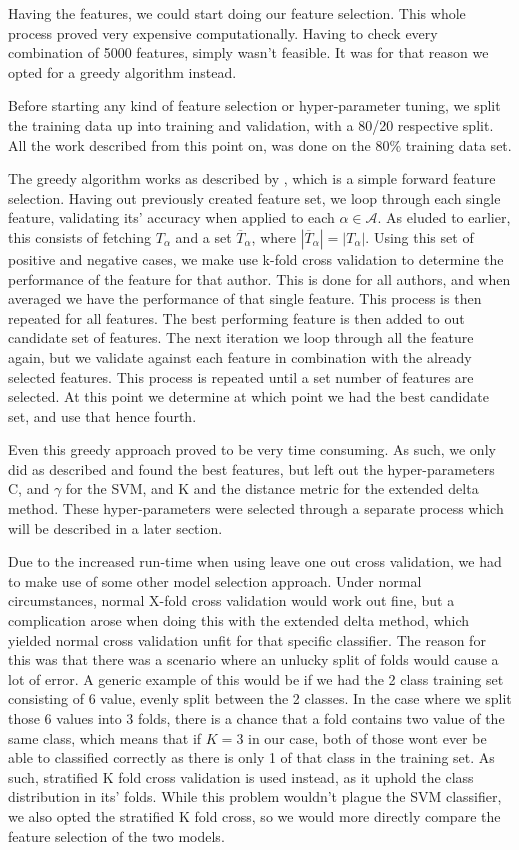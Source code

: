 Having the features, we could start doing our feature selection. This whole
process proved very expensive computationally. Having to check every combination
of 5000 features, simply wasn't feasible. It was for that reason we opted for a
greedy algorithm instead.

Before starting any kind of feature selection or hyper-parameter tuning,
we split the training data up into training and validation, with a
80/20 respective split. All the work described from this point on,
was done on the 80\% training data set.

The greedy algorithm works as described by \cite{kanDeng}, which is a simple
forward feature selection. Having out previously created feature set, we loop
through each single feature, validating its' accuracy when applied to each
$\alpha \in \mathcal{A}$. As eluded to earlier, this consists of fetching
$T_{\alpha}$ and a set $\overline{T}_{\alpha}$, where $|\overline{T}_\alpha| =
|T_\alpha|$. Using this set of positive and negative cases, we make use k-fold
cross validation to determine the performance of the feature for that author.
This is done for all authors, and when averaged we have the performance of
that single feature. This process is then repeated for all features. The best
performing feature is then added to out candidate set of features. The next
iteration we loop through all the feature again, but we validate against each
feature in combination with the already selected features. This process is
repeated until a set number of features are selected. At this point we determine
at which point we had the best candidate set, and use that hence fourth.

Even this greedy approach proved to be very time consuming. As such, we only did
as described and found the best features, but left out the hyper-parameters C,
and $\gamma$ for the SVM, and K and the distance metric for the extended delta
method. These hyper-parameters were selected through a separate process
which will be described in a later section.

Due to the increased run-time when using leave one out cross validation,
we had to make use of some other model selection approach. Under normal
circumstances, normal X-fold cross validation would work out fine, but a complication
arose when doing this with the extended delta method, which yielded normal
cross validation unfit for that specific classifier.
The reason for this was that there was a scenario where an unlucky split of
folds would cause a lot of error. A generic example of this would be if we
had the 2 class training set consisting of 6 value, evenly split between the
2 classes. In the case where we split those 6 values into 3 folds, there is a
chance that a fold contains two value of the same class, which means that if $K
= 3$ in our case, both of those wont ever be able to classified correctly as
there is only 1 of that class in the training set. As such, stratified K fold
cross validation is used instead, as it uphold the class distribution in its'
folds. While this problem wouldn't plague the SVM classifier, we also opted
the stratified K fold cross, so we would more directly compare the feature selection
of the two models.

